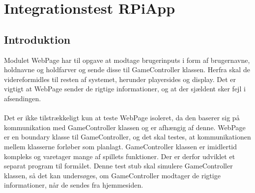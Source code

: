 \documentclass[Integrationstest/Integrationstest_main.tex]{subfiles}
\begin{document}
\lstset{style=customc}

\section{Integrationstest RPiApp}
\subsection{Introduktion}
Modulet WebPage har til opgave at modtage brugerinputs i form af brugernavne, holdnavne og holdfarver og sende disse til GameController klassen. Herfra skal de videreformidles til resten af systemet, herunder playersides og display. Det er vigtigt at WebPage sender de rigtige informationer, og at der sjældent sker fejl i afsendingen. \\\\Det er ikke tilstrækkeligt kun at teste WebPage isoleret, da den baserer sig på kommunikation med GameController klassen og er afhængig af denne. WebPage er en boundary klasse til GameController, og det skal testes, at kommunikationen mellem klasserne forløber som planlagt. GameController klassen er imidlertid kompleks og varetager  mange af spillets funktioner. Der er derfor udviklet et separat program til formålet. Denne test stub skal simulere GameController klassen, så det kan undersøges, om GameController modtager de rigtige informationer, når de sendes fra hjemmesiden. 
\end{document}
